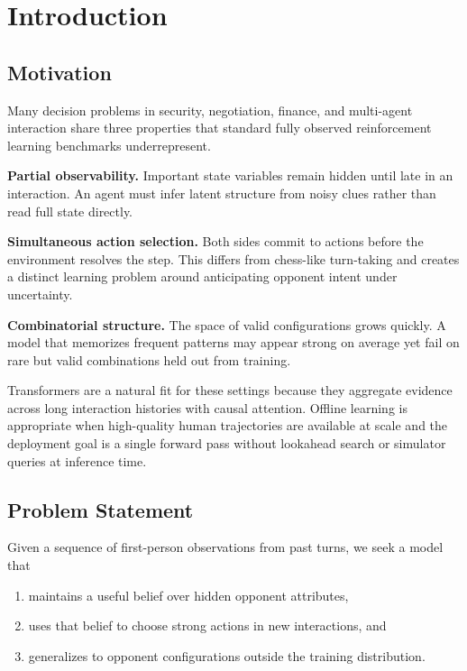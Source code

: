 \chapter{Introduction}
\label{ch:introduction}

\section{Motivation}

Many decision problems in security, negotiation, finance, and multi-agent
interaction share three properties that standard fully observed reinforcement
learning benchmarks underrepresent.

\textbf{Partial observability.} Important state variables remain hidden until
late in an interaction. An agent must infer latent structure from noisy clues
rather than read full state directly.

\textbf{Simultaneous action selection.} Both sides commit to actions before the
environment resolves the step. This differs from chess-like turn-taking and
creates a distinct learning problem around anticipating opponent intent under
uncertainty.

\textbf{Combinatorial structure.} The space of valid configurations grows
quickly. A model that memorizes frequent patterns may appear strong on average
yet fail on rare but valid combinations held out from training.

Transformers are a natural fit for these settings because they aggregate evidence
across long interaction histories with causal attention. Offline learning is
appropriate when high-quality human trajectories are available at scale and the
deployment goal is a single forward pass without lookahead search or simulator
queries at inference time.

\section{Problem Statement}

Given a sequence of first-person observations from past turns, we seek a
model that
\begin{enumerate}[label=(\roman*)]
  \item maintains a useful belief over hidden opponent attributes,
  \item uses that belief to choose strong actions in new interactions, and
  \item generalizes to opponent configurations outside the training distribution.
\end{enumerate}

